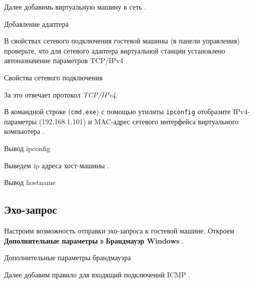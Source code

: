 Далее добавимь виртуальную машину в сеть .

\begin{image}
	\caption{Добавление адаптера}
	\label{fig:add:net:adapter}
\end{image}

В свойствах сетевого подключения гостевой машины (в панели управления)
проверьте, что для сетевого адаптера виртуальной станции установлено
автоназначение параметров TCP/IPv4 .

\begin{image}
	\caption{Свойства сетевого подключения}
	\label{fig:spec:net:connection}
\end{image}

За это отвечает протокол \textit{TCP/IPv4}.

В командной строке (\texttt{cmd.exe}) с помощью утилиты \texttt{ipconfig}
отобразите IPv4-параметры (192.168.1.101) и MAC-адрес сетевого интерфейса
виртуального компьютера .

\begin{image}
	\caption{Вывод ipconfig}
	\label{fig:ipconfig}
\end{image}

Выведем ip адреса хост-машины .

\begin{image}
	\caption{Вывод hostname}
	\label{fig:host:ip}
\end{image}

\subsection{Эхо-запрос}

Настроим возможность отправки эхо-запроса к гостевой машине.
Откроем \textbf{Дополнительные параметры} в \textbf{Брандмауэр Windows}
.

\begin{image}
	\caption{Дополнительные параметры брандмауэра}
	\label{fig:firewall:setting}
\end{image}

Далее добавим правило для входящий подключений ICMP
.

